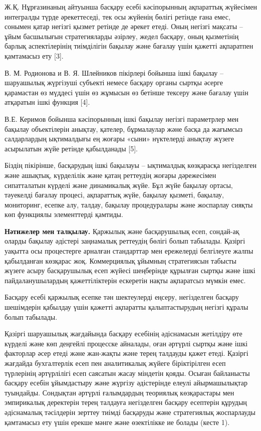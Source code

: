 \begin{multicols}{2}
Ж.Қ. Нұрғазинаның айтуынша басқару есебі кәсіпорынның ақпараттық
жүйесімен интегралды түрде әрекеттеседі, тек осы жүйенің бөлігі ретінде
ғана емес, сонымен қатар негізгі қызмет ретінде де әрекет етеді. Оның
негізгі мақсаты -- ұйым басшылығын стратегияларды әзірлеу, жедел
басқару, оның қызметінің барлық аспектілерінің тиімділігін бақылау және
бағалау үшін қажетті ақпаратпен қамтамасыз ету {[}3{]}.

В. М. Родионова и В. Я. Шлейников пікірлері бойынша ішкі бақылау --
шаруашылық жүргізуші субъекті немесе басқару органы сыртқы әсерге
қарамастан өз мүддесі үшін өз жұмысын өз бетінше тексеру және бағалау
үшін атқаратын ішкі функция {[}4{]}.

В.Е. Керимов бойынша кәсіпорынның ішкі бақылау негізгі параметрлер мен
бақылау объектілерін анықтау, қателер, бұрмалаулар және басқа да
жағымсыз салдарлардың ықтималдығы ең жоғары «сыни» нүктелерді анықтау
жүзеге асырылатын жүйе ретінде қабылданады {[}5{]}.

Біздің пікірінше, басқарудың ішкі бақылауы -- ықтималдық көзқарасқа
негізделген және ашықтық, күрделілік және қатаң реттеудің жоғары
дәрежесімен сипатталатын күрделі және динамикалық жүйе. Бұл жүйе бақылау
ортасы, тәуекелді бағалау процесі, ақпараттық жүйе, бақылау қызметі,
бақылау, мониторинг, есепке алу, талдау, бақылау процедуралары және
жоспарлау сияқты көп функциялы элементтерді қамтиды.

{\bfseries Нәтижелер мен талқылау.} Қаржылық және басқарушылық есеп,
сондай-ақ оларды бақылау әдістері заңнамалық реттеудің бөлігі болып
табылады. Қазіргі уақытта осы процестерге арналған стандарттар мен
ережелерді белгілеуге жалпы қабылданған көзқарас жоқ. Коммерциялық
ұйымның стратегиясын табысты жүзеге асыру басқарушылық есеп жүйесі
шеңберінде құрылған сыртқы және ішкі пайдаланушылардың қажеттіліктерін
ескеретін нақты ақпаратсыз мүмкін емес.

Басқару есебі қаржылық есепке тән шектеулерді еңсеру, негізделген
басқару шешімдерін қабылдау үшін қажетті ақпаратты қалыптастырудың
негізгі құралы болып табылады.

Қазіргі шаруашылық жағдайында басқару есебінің әдіснамасын жетілдіру өте
күрделі және көп деңгейлі процесске айналады, оған әртүрлі сыртқы және
ішкі факторлар әсер етеді және жан-жақты және терең талдауды қажет
етеді. Қазіргі жағдайда бухгалтерлік есеп пен аналитикалық жүйеге
біріктірілген есеп түрлерінің әртүрлілігі есеп саясатын жасау міндетін
қояды. Осыған байланысты басқару есебін ұйымдастыру және жүргізу
әдістерінде елеулі айырмашылықтар туындайды. Сондықтан әртүрлі
ғалымдардың теориялық көзқарастары мен эмпирикалық деректерін терең
талдауға негізделген басқару есептерін құрудың әдіснамалық тәсілдерін
зерттеу тиімді басқаруды және стратегиялық жоспарлауды қамтамасыз ету
үшін ерекше мәнге және өзектілікке ие болады (кесте 1).


\end{multicols}
